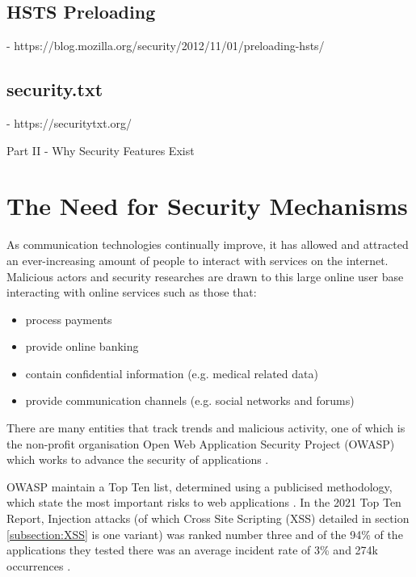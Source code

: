 \documentclass{mscreport}
\begin{document}
\subsection{HSTS Preloading}
- https://blog.mozilla.org/security/2012/11/01/preloading-hsts/


\subsection{security.txt}
- https://securitytxt.org/

\newpage

\vspace*{\fill}
\begin{center}
\begin{huge}
Part II - Why Security Features Exist
\end{huge}
\end{center}
\vspace{\fill}

\newpage

\section{The Need for Security Mechanisms}
\label{section:need_for_security_mechanisms}

As communication technologies continually improve, it has allowed and attracted an ever-increasing amount of people to interact with services on the internet. Malicious actors and security researches are drawn to this large online user base interacting with online services such as those that:
\begin{itemize}
	\setlength\itemsep{0.1em}
	\item process payments \cite{Herman2019-zb}
	\item provide online banking \cite{Gezer2019-oy}
	\item contain confidential information (e.g. medical related data) \cite{Mrdjenovich2020-vz}
	\item provide communication channels (e.g. social networks and forums)
\end{itemize}

\vspace{0.3cm} \noindent
There are many entities that track trends and malicious activity, one of which is the non-profit organisation Open Web Application Security Project (OWASP) which works to advance the security of applications \cite{noauthor_undated-ta,Kellezi2021-nd}.

\vspace{0.3cm} \noindent
OWASP maintain a Top Ten list, determined using a publicised methodology, which state the most important risks to web applications \cite{Kellezi2021-nd,noauthor_undated-kz}. In the 2021 Top Ten Report, Injection attacks (of which Cross Site Scripting (XSS) detailed in section \ref{subsection:XSS} is one variant) was ranked number three and of the 94\% of the applications they tested there was an average incident rate of 3\% and 274k occurrences \cite{noauthor_undated-gt}.
\end{document}
